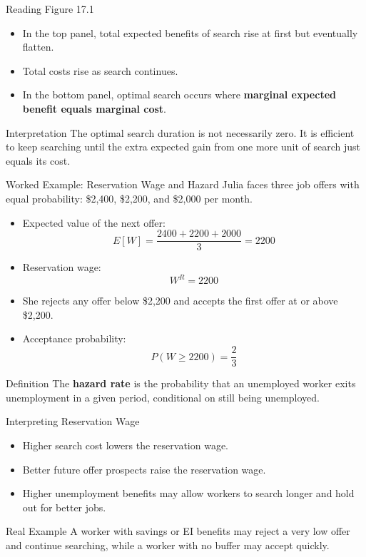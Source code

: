 \documentclass[aspectratio=169]{beamer}
\begin{document}
\begin{frame}{Reading Figure 17.1}
\transfade
\begin{itemize}
  \item In the top panel, total expected benefits of search rise at first but eventually flatten.
  \item Total costs rise as search continues.
  \item In the bottom panel, optimal search occurs where \textbf{marginal expected benefit equals marginal cost}.
\end{itemize}

\begin{block}{Interpretation}
The optimal search duration is not necessarily zero. It is efficient to keep searching until the extra expected gain from one more unit of search just equals its cost.
\end{block}
\end{frame}

\begin{frame}{Worked Example: Reservation Wage and Hazard}
\transfade
Julia faces three job offers with equal probability: \$2,400, \$2,200, and \$2,000 per month.

\begin{itemize}
  \item Expected value of the next offer:
  \[
  E[W] = \frac{2400 + 2200 + 2000}{3} = 2200
  \]
  \item Reservation wage:
  \[
  W^R = 2200
  \]
  \item She rejects any offer below \$2,200 and accepts the first offer at or above \$2,200.
  \item Acceptance probability:
  \[
  P(W \geq 2200) = \frac{2}{3}
  \]
\end{itemize}

\begin{block}{Definition}
The \textbf{hazard rate} is the probability that an unemployed worker exits unemployment in a given period, conditional on still being unemployed.
\end{block}
\end{frame}

\begin{frame}{Interpreting Reservation Wage}
\transfade
\begin{itemize}
  \item Higher search cost lowers the reservation wage.
  \item Better future offer prospects raise the reservation wage.
  \item Higher unemployment benefits may allow workers to search longer and hold out for better jobs.
\end{itemize}

\begin{exampleblock}{Real Example}
A worker with savings or EI benefits may reject a very low offer and continue searching, while a worker with no buffer may accept quickly.
\end{exampleblock}
\end{frame}
\end{document}
